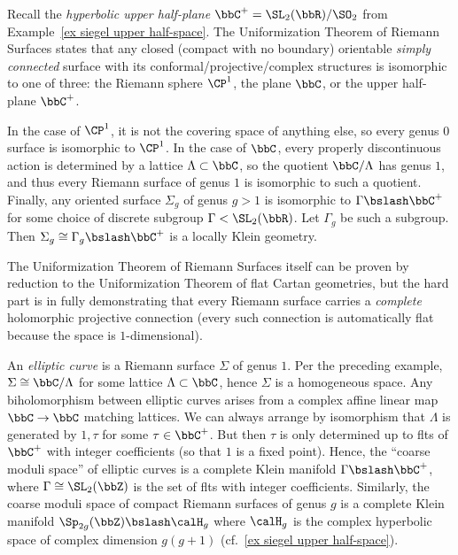\begin{example}
    Recall the \emph{hyperbolic upper half-plane} $\bbC^+=\SL_2(\bbR)\slash \SO_2$ from Example~\ref{ex siegel upper half-space}. The Uniformization Theorem of Riemann Surfaces states that any closed (compact with no boundary) orientable \emph{simply connected} surface with its conformal/projective/complex structures is isomorphic to one of three: the Riemann sphere $\CP^1$, the plane $\bbC$, or the upper half-plane $\bbC^+$.

    In the case of $\CP^1$, it is not the covering space of anything else, so every genus $0$ surface is isomorphic to $\CP^1$. In the case of $\bbC$, every properly discontinuous action is determined by a lattice $\Lambda\subset \bbC$, so the quotient $\bbC\slash\Lambda$ has genus $1$, and thus every Riemann surface of genus $1$ is isomorphic to such a quotient. Finally, any oriented surface $\Sigma_g$ of genus $g>1$ is isomorphic to $\Gamma\bslash \bbC^+$ for some choice of discrete subgroup $\Gamma<\SL_2(\bbR)$. Let $\Gamma_g$ be such a subgroup. Then $\Sigma_g\cong \Gamma_g\bslash \bbC^+$ is a locally Klein geometry.
\end{example}

The Uniformization Theorem of Riemann Surfaces itself can be proven by reduction to the Uniformization Theorem of flat Cartan geometries, but the hard part is in fully demonstrating that every Riemann surface carries a \emph{complete} holomorphic projective connection (every such connection is automatically flat because the space is $1$-dimensional). 

\begin{example}
    An \emph{elliptic curve} is a Riemann surface $\Sigma$ of genus $1$. Per the preceding example, $\Sigma\cong \bbC\slash\Lambda$ for some lattice $\Lambda\subset\bbC$, hence $\Sigma$ is a homogeneous space. Any biholomorphism between elliptic curves arises from a complex affine linear map $\bbC\to\bbC$ matching lattices. We can always arrange by isomorphism that $\Lambda$ is generated by $1,\tau$ for some $\tau\in \bbC^+$. But then $\tau$ is only determined up to \glspl{flt} of $\bbC^+$ with integer coefficients (so that $1$ is a fixed point). Hence, the ``coarse moduli space'' of elliptic curves is a complete Klein manifold $\Gamma\bslash \bbC^+$, where $\Gamma\cong \SL_2(\bbZ)$ is the set of \glspl{flt} with integer coefficients. Similarly, the coarse moduli space of compact Riemann surfaces of genus $g$ is a complete Klein manifold $\Sp_{2g}(\bbZ) \bslash \calH_g$ where $\calH_g$ is the complex hyperbolic space of complex dimension $g(g+1)$ (cf.~\ref{ex siegel upper half-space}).
\end{example}


